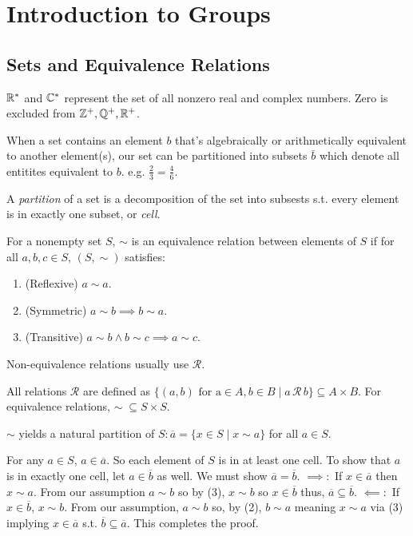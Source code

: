 \chapter{Introduction to Groups}

\section{Sets and Equivalence Relations}

\begin{note}
    $\mathbb{R}^*$ and $\mathbb{C}^*$ represent the set of all nonzero real and complex numbers. Zero is excluded from $\mathbb{Z}^+, \mathbb{Q}^+, \mathbb{R}^+$.
\end{note}
\begin{note}
    When a set contains an element $b$ that's algebraically or arithmetically equivalent to another element(s), our set can be partitioned into subsets $\overline{b}$ which denote all entitites equivalent to $b$. e.g. $\frac{2}{3} = \frac{4}{6}$.
\end{note}
\begin{definition}[Parititon]
    A \textit{partition} of a set is a decomposition of the set into subsests s.t. every element is in exactly one subset, or \textit{cell}.
\end{definition}
\begin{definition}
    For a nonempty set $S$, $\sim$ is an equivalence relation between elements of $S$ if for all $a,b,c \in S$, $(S, \sim)$ satisfies:
    \begin{enumerate}
        \item (Reflexive) $a\sim a$.
        \item (Symmetric) $a\sim b \implies b\sim a$.
        \item (Transitive) $a\sim b \land b\sim c \implies a\sim c$.
    \end{enumerate}
    Non-equivalence relations usually use $\mathscr{R}$. 
\end{definition}
\begin{note}
    All relations $\mathscr{R}$ are defined as $\{ (a,b) \text{ for a} \in A, b \in B \mid a \, \mathscr{R} \, b\} \subseteq A \times B$. For equivalence relations, $\sim \; \subseteq S \times S$.
\end{note}
\begin{remark}
    $\sim$ yields a natural partition of $S\colon \overline{a} = \{x \in S \mid x \sim a\}$ for all $a \in S$.
\end{remark}
\begin{explanation}
    For any $a \in S$, $a \in \overline{a}$. So each element of $S$ is in at least one cell. To show that $a$ is in exactly one cell, let $a \in \overline{b}$ as well. We must show $\overline{a} = \overline{b}$. $\implies:$ If $x \in \overline{a}$ then $x \sim a$. From our assumption $a \sim b$ so by (3), $x \sim b$ so $x \in \overline{b}$ thus, $\overline{a} \subseteq \overline{b}$. $\impliedby:$ If $x \in \overline{b}$, $x \sim b$. From our assumption, $a \sim b$ so, by (2), $b \sim a$ meaning $x \sim a$ via (3) implying $x \in \overline{a}$ s.t. $\overline{b} \subseteq \overline{a}$. This completes the proof.
\end{explanation}
